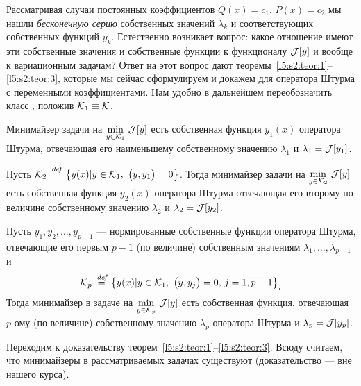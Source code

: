 Рассматривая случаи постоянных коэффициентов $Q(x)=c_1$, $P(x)=c_2$ мы нашли \emph{бесконечную серию} собственных значений $\lambda_k$ и соответствующих собственных функций $y_k$. Естественно возникает вопрос: какое отношение имеют эти собственные значения и собственные функции к функционалу $\mathcal{J}[y]$ и вообще к вариационным задачам? Ответ на этот вопрос дают теоремы~\ref{l5:s2:teor:1}--\ref{l5:s2:teor:3}, которые мы сейчас сформулируем и докажем для оператора Штурма с переменными коэффициентами. Нам удобно в дальнейшем переобозначить класс \K, положив $\mathcal{K}_1\equiv\mathcal{K}$.
\begin{_teor}
	\label{l5:s2:teor:1}
	Минимайзер задачи на $\displaystyle\min\limits_{y\in\mathcal{K}_1}\,\mathcal{J}[y]$ есть собственная функция $y_1(x)$ оператора Штурма, отвечающая его наименьшему собственному значению $\lambda_1$ и $\lambda_1=\mathcal{J}[y_1]$.
\end{_teor}
\begin{_teor}
	\label{l5:s2:teor:2}
	Пусть $\displaystyle\K_2\eqdef\left\{y(x)|y\in\K_1,\ \big(y,y_1\big)=0\right\}$. Тогда минимайзер задачи на $\displaystyle\min\limits_{y\in\mathcal{K}_2}\,\mathcal{J}[y]$ есть собственная функция $y_2(x)$ оператора Штурма отвечающая его второму по величине собственному значению $\lambda_2$ и $\lambda_2=\mathcal{J}[y_2]$.
\end{_teor}
\begin{_teor}
	\label{l5:s2:teor:3}
	Пусть $y_1,y_2,\ldots,y_{p-1}$ --- нормированные собственные функции оператора Штурма, отвечающие его первым $p-1$ (по величине) собственным значениям $\lambda_1,\ldots,\lambda_{p-1}$ и 
	\begin{equation*}
		\hfill\displaystyle\K_p\eqdef\left\{y(x)|y\in\K_1,\ \big(y,y_j\big)=0,\,j=\overline{1,p-1}\right\}_{\displaystyle.}\hfill
	\end{equation*}
	Тогда минимайзер в задаче на $\displaystyle\min\limits_{y\in\mathcal{K}_p}\,\mathcal{J}[y]$ есть собственная функция, отвечающая $p$-ому (по величине) собственному значению $\lambda_p$ оператора Штурма и $\lambda_p=\mathcal{J}[y_p]$.  
\end{_teor}
Переходим к доказательству теорем~\ref{l5:s2:teor:1}--\ref{l5:s2:teor:3}. 	Всюду считаем, что минимайзеры в рассматриваемых задачах существуют (доказательство --- вне нашего курса). 
